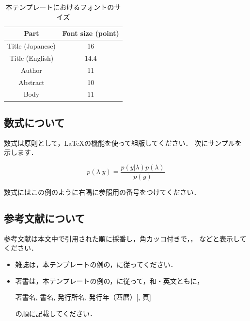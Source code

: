 \documentclass[dvipdfmx]{issj}
\begin{document}
\begin{table}[htbp]\centering
\caption{本テンプレートにおけるフォントのサイズ}\label{tbl:font}
\begin{small}
\begin{tabular}{|c|c|} \hline
Part             & Font size (point)\\\hline\hline
Title (Japanese) & 16\\\hline
Title (English)  & 14.4\\\hline
Author           & 11\\\hline
Abstract         & 10\\\hline
Body             & 11\\\hline
\end{tabular}
\end{small}
\end{table}

\subsection{数式について}  %

数式は原則として，{\LaTeX}の機能を使って組版してください．
次にサンプルを示します．

\begin{equation}
	p( \lambda \vert y  ) = \frac{p( y \vert \lambda ) p( \lambda )}{p( y )}
\end{equation}


数式にはこの例のように右隅に参照用の番号をつけてください．

\subsection{参考文献について}  %

参考文献は本文中で引用された順に採番し，角カッコ付きで\cite{bib:SO2004}，\cite{bib:HV1987}，
\cite{bib:NT1996}などと表示してください．

\begin{itemize}
\item[] 雑誌は，本テンプレートの例の\cite{bib:SO2004}，\cite{bib:HV1987}に従ってください．
\item[] 著書は，本テンプレートの例の\cite{bib:NT1996}，\cite{bib:K19751976}に従って，和・英文ともに，
      \begin{center}
          著書名, 書名, 発行所名, 発行年（西暦）[, 頁]
      \end{center}の順に記載してください．
\end{itemize}
\end{document}
